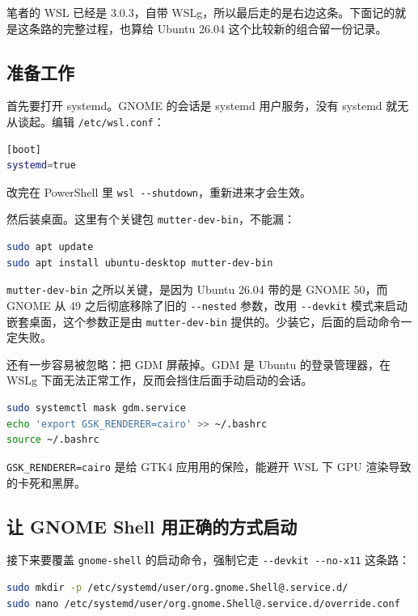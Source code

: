 \documentclass[12pt,a4paper]{ctexbook}
\begin{document}
笔者的 WSL 已经是 3.0.3，自带 WSLg，所以最后走的是右边这条。下面记的就是这条路的完整过程，也算给 Ubuntu 26.04 这个比较新的组合留一份记录。

\subsection{准备工作}

首先要打开 systemd。GNOME 的会话是 systemd 用户服务，没有 systemd 就无从谈起。编辑 \verb|/etc/wsl.conf|：

\begin{lstlisting}[language=bash,title={启用 systemd}]
[boot]
systemd=true
\end{lstlisting}

改完在 PowerShell 里 \verb|wsl --shutdown|，重新进来才会生效。

然后装桌面。这里有个关键包 \verb|mutter-dev-bin|，不能漏：

\begin{lstlisting}[language=bash,title={安装桌面环境}]
sudo apt update
sudo apt install ubuntu-desktop mutter-dev-bin
\end{lstlisting}

\verb|mutter-dev-bin| 之所以关键，是因为 Ubuntu 26.04 带的是 GNOME 50，而 GNOME 从 49 之后彻底移除了旧的 \verb|--nested| 参数，改用 \verb|--devkit| 模式来启动嵌套桌面，这个参数正是由 \verb|mutter-dev-bin| 提供的。少装它，后面的启动命令一定失败。

还有一步容易被忽略：把 GDM 屏蔽掉。GDM 是 Ubuntu 的登录管理器，在 WSLg 下面无法正常工作，反而会挡住后面手动启动的会话。

\begin{lstlisting}[language=bash,title={屏蔽 GDM 并降低渲染要求}]
sudo systemctl mask gdm.service
echo 'export GSK_RENDERER=cairo' >> ~/.bashrc
source ~/.bashrc
\end{lstlisting}

\verb|GSK_RENDERER=cairo| 是给 GTK4 应用用的保险，能避开 WSL 下 GPU 渲染导致的卡死和黑屏。

\subsection{让 GNOME Shell 用正确的方式启动}

接下来要覆盖 \verb|gnome-shell| 的启动命令，强制它走 \verb|--devkit --no-x11| 这条路：

\begin{lstlisting}[language=bash,title={创建 systemd 覆盖文件}]
sudo mkdir -p /etc/systemd/user/org.gnome.Shell@.service.d/
sudo nano /etc/systemd/user/org.gnome.Shell@.service.d/override.conf
\end{lstlisting}
\end{document}
